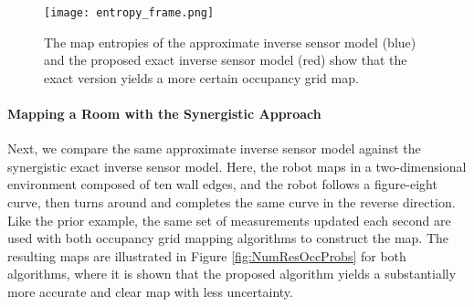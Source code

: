 \begin{figure}
  \centering
  \texttt{[image: entropy\_frame.png]}
  \caption{The map entropies of the approximate inverse sensor model (blue) and the proposed exact inverse sensor model (red) show that the exact version yields a more certain occupancy grid map.}
  \label{fig:entropy}
\end{figure}



\paragraph{Mapping a Room with the Synergistic Approach}

Next, we compare the same approximate inverse sensor model against the synergistic exact inverse sensor model.
Here, the robot maps in a two-dimensional environment composed of ten wall edges, and the robot follows a figure-eight curve, then turns around and completes the same curve in the reverse direction. Like the prior example, the same set of measurements updated each second are used with both occupancy grid mapping algorithms to construct the map.
The resulting maps are illustrated in Figure \ref{fig:NumResOccProbs} for both algorithms, where it is shown that the proposed algorithm yields a substantially more accurate and clear map with less uncertainty. 

